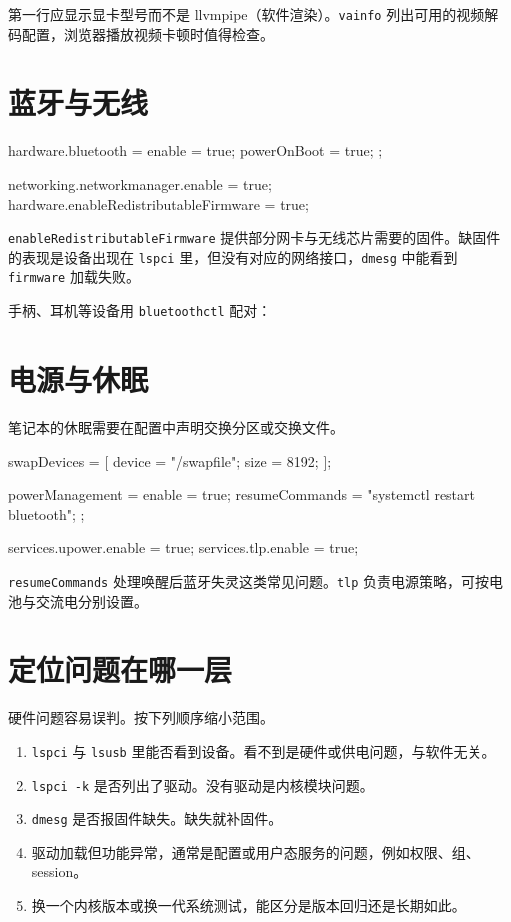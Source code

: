 第一行应显示显卡型号而不是 llvmpipe（软件渲染）。\texttt{vainfo} 列出可用的视频解码配置，浏览器播放视频卡顿时值得检查。

\section{蓝牙与无线}

\begin{nixcode}
hardware.bluetooth = {
  enable = true;
  powerOnBoot = true;
};

networking.networkmanager.enable = true;
hardware.enableRedistributableFirmware = true;
\end{nixcode}

\texttt{enableRedistributableFirmware} 提供部分网卡与无线芯片需要的固件。缺固件的表现是设备出现在 \texttt{lspci} 里，但没有对应的网络接口，\texttt{dmesg} 中能看到 \texttt{firmware} 加载失败。

手柄、耳机等设备用 \texttt{bluetoothctl} 配对：


\section{电源与休眠}

笔记本的休眠需要在配置中声明交换分区或交换文件。

\begin{nixcode}
swapDevices = [ { device = "/swapfile"; size = 8192; } ];

powerManagement = {
  enable = true;
  resumeCommands = "systemctl restart bluetooth";
};

services.upower.enable = true;
services.tlp.enable = true;
\end{nixcode}

\texttt{resumeCommands} 处理唤醒后蓝牙失灵这类常见问题。\texttt{tlp} 负责电源策略，可按电池与交流电分别设置。

\section{定位问题在哪一层}

硬件问题容易误判。按下列顺序缩小范围。

\begin{enumerate}
  \item \texttt{lspci} 与 \texttt{lsusb} 里能否看到设备。看不到是硬件或供电问题，与软件无关。
  \item \texttt{lspci -k} 是否列出了驱动。没有驱动是内核模块问题。
  \item \texttt{dmesg} 是否报固件缺失。缺失就补固件。
  \item 驱动加载但功能异常，通常是配置或用户态服务的问题，例如权限、组、session。
  \item 换一个内核版本或换一代系统测试，能区分是版本回归还是长期如此。
\end{enumerate}

